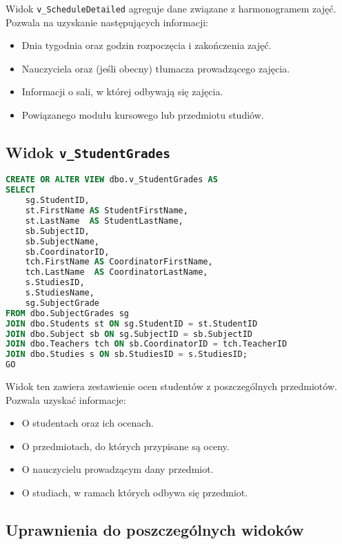 \documentclass[12pt]{article}
\begin{document}
\noindent Widok \texttt{v\_ScheduleDetailed} agreguje dane związane z harmonogramem zajęć. Pozwala na uzyskanie następujących informacji:
\begin{itemize}
    \item Dnia tygodnia oraz godzin rozpoczęcia i zakończenia zajęć.
    \item Nauczyciela oraz (jeśli obecny) tłumacza prowadzącego zajęcia.
    \item Informacji o sali, w której odbywają się zajęcia.
    \item Powiązanego modułu kursowego lub przedmiotu studiów.
\end{itemize}

\newpage
\subsection{Widok \texttt{v\_StudentGrades}}

\begin{lstlisting}[language=SQL]
CREATE OR ALTER VIEW dbo.v_StudentGrades AS
SELECT
    sg.StudentID,
    st.FirstName AS StudentFirstName,
    st.LastName  AS StudentLastName,
    sb.SubjectID,
    sb.SubjectName,
    sb.CoordinatorID,
    tch.FirstName AS CoordinatorFirstName,
    tch.LastName  AS CoordinatorLastName,
    s.StudiesID,
    s.StudiesName,
    sg.SubjectGrade
FROM dbo.SubjectGrades sg
JOIN dbo.Students st ON sg.StudentID = st.StudentID
JOIN dbo.Subject sb ON sg.SubjectID = sb.SubjectID
JOIN dbo.Teachers tch ON sb.CoordinatorID = tch.TeacherID
JOIN dbo.Studies s ON sb.StudiesID = s.StudiesID;
GO
\end{lstlisting}

\noindent Widok ten zawiera zestawienie ocen studentów z poszczególnych przedmiotów. Pozwala uzyskać informacje:
\begin{itemize}
    \item O studentach oraz ich ocenach.
    \item O przedmiotach, do których przypisane są oceny.
    \item O nauczycielu prowadzącym dany przedmiot.
    \item O studiach, w ramach których odbywa się przedmiot.
\end{itemize}

\subsection{Uprawnienia do poszczególnych widoków}
\end{document}
